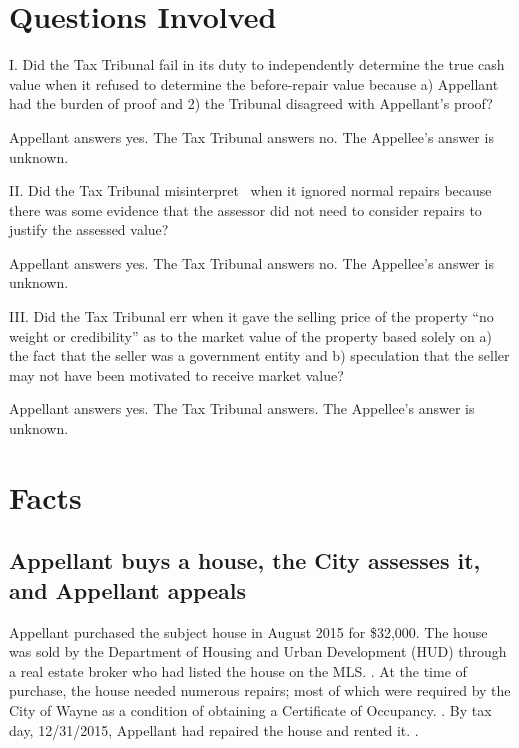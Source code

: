 \documentclass[12pt,\documentclassflag]{michiganCourtOfAppealsBrief}
\begin{document}


\newpage 
\section{Questions Involved} 

\noindent I. Did the Tax Tribunal fail in its duty to independently determine the true cash value when it refused to determine the before-repair value because a) Appellant had the burden of proof and 2) the Tribunal disagreed with Appellant's proof?

Appellant answers yes. The Tax Tribunal answers no. The Appellee's answer is unknown. 
\vspace{\baselineskip}

\noindent II. Did the Tax Tribunal misinterpret \mathieuGast\ when it ignored normal repairs because there was some evidence that the assessor did not need to consider repairs to justify the assessed value?

Appellant answers yes. The Tax Tribunal answers no. The Appellee's answer is unknown.

\vspace{\baselineskip}

\noindent III. Did the Tax Tribunal err when it gave the selling price of the property ``no weight or credibility'' as to the market value of the property based solely on a) the fact that the seller was a government entity and b) speculation that the seller may not have been motivated to receive market value?

Appellant answers yes. The Tax Tribunal answers. The Appellee's answer is unknown. 
 
\newpage

\section{Facts}
\label{facts}
\subsection{Appellant buys a house, the City assesses it, and Appellant appeals}

Appellant purchased the subject house in August 2015 for \$32,000. The house was sold by the Department of Housing and Urban Development (HUD) through a real estate broker who had listed the house on the MLS. \mlsListing[]. At the time of purchase, the house needed numerous repairs; most of which were required by the City of Wayne as a condition of obtaining a Certificate of Occupancy. \repairs[]. By tax day, 12/31/2015, Appellant had repaired the house and rented it. \foj[4-5].
\end{document}
